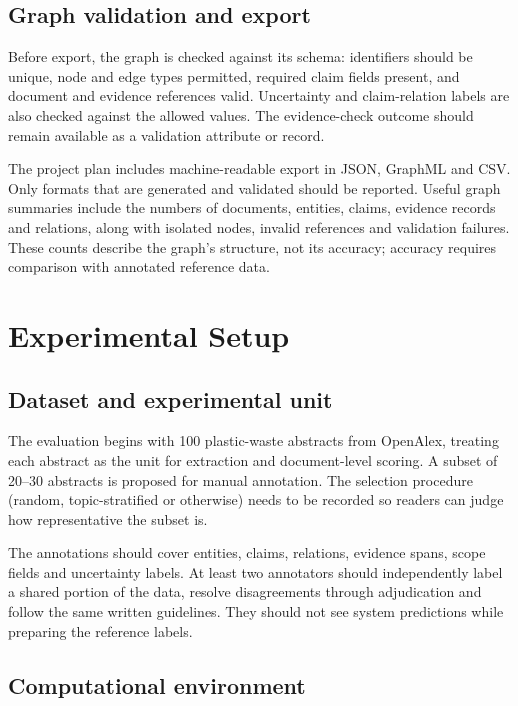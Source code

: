 \documentclass[11pt,a4paper]{article}
\begin{document}
\subsection{Graph validation and export}

Before export, the graph is checked against its schema: identifiers should be unique, node and edge types permitted, required claim fields present, and document and evidence references valid. Uncertainty and claim-relation labels are also checked against the allowed values. The evidence-check outcome should remain available as a validation attribute or record.

The project plan includes machine-readable export in JSON, GraphML and CSV. Only formats that are generated and validated should be reported. Useful graph summaries include the numbers of documents, entities, claims, evidence records and relations, along with isolated nodes, invalid references and validation failures. These counts describe the graph's structure, not its accuracy; accuracy requires comparison with annotated reference data.

\section{Experimental Setup}

\subsection{Dataset and experimental unit}

The evaluation begins with 100 plastic-waste abstracts from OpenAlex, treating each abstract as the unit for extraction and document-level scoring. A subset of 20--30 abstracts is proposed for manual annotation. The selection procedure (random, topic-stratified or otherwise) needs to be recorded so readers can judge how representative the subset is.

The annotations should cover entities, claims, relations, evidence spans, scope fields and uncertainty labels. At least two annotators should independently label a shared portion of the data, resolve disagreements through adjudication and follow the same written guidelines. They should not see system predictions while preparing the reference labels.

\subsection{Computational environment}
\end{document}
